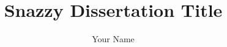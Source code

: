 \documentclass[12pt]{report}
\title{Snazzy Dissertation Title}
\author{Your Name}
\begin{document}





% 

\newpage
\begin{singlespacing}
\tableofcontents
\end{singlespacing}
\newpage
{} 




\begin{appendices}

\end{appendices}

\singlespacing%
\nocite{*}      %

\end{document}
